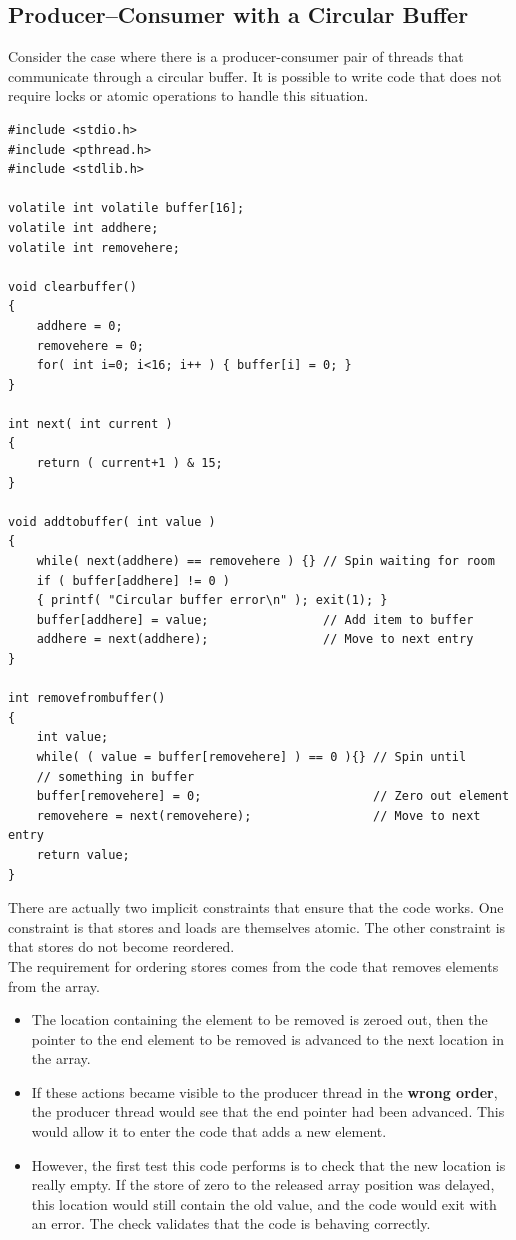 \documentclass[12pt,a4paper]{report}
\begin{document}
\subsection{Producer--Consumer with a Circular Buffer}
Consider the case where there is a producer-consumer pair of threads that communicate through a circular buffer. It is possible to write code that does not require locks or atomic operations to handle this situation.
\begin{lstlisting}
#include <stdio.h>
#include <pthread.h>
#include <stdlib.h>

volatile int volatile buffer[16];
volatile int addhere;
volatile int removehere;

void clearbuffer()
{
	addhere = 0;
	removehere = 0;
	for( int i=0; i<16; i++ ) { buffer[i] = 0; }
}

int next( int current )
{
	return ( current+1 ) & 15;
}

void addtobuffer( int value )
{
	while( next(addhere) == removehere ) {} // Spin waiting for room
	if ( buffer[addhere] != 0 )
	{ printf( "Circular buffer error\n" ); exit(1); }
	buffer[addhere] = value;                // Add item to buffer
	addhere = next(addhere);                // Move to next entry
}

int removefrombuffer()
{
	int value;
	while( ( value = buffer[removehere] ) == 0 ){} // Spin until
	// something in buffer
	buffer[removehere] = 0;                        // Zero out element
	removehere = next(removehere);                 // Move to next entry
	return value;
}
\end{lstlisting}
There are actually two implicit constraints that ensure that the code works. One constraint is that stores and loads are themselves atomic. The other constraint is that stores do not become reordered.
\\
The requirement for ordering stores comes from the code that removes elements from the array.
\begin{itemize}
	\item The location containing the element to be removed is zeroed out, then the pointer to the end element to be removed is advanced to the next location in the array.
	\item If these actions became visible to the producer thread in the \textbf{wrong order}, the producer thread would see that the end pointer had been advanced. This would allow it to enter the code that adds a new element.
	\item However, the first test this code performs is to check that the new location is really empty. If the store of zero to the released array position was delayed, this location would still contain the old value, and the code would exit with an error. The check validates that the code is behaving correctly.
\end{itemize}
\end{document}
